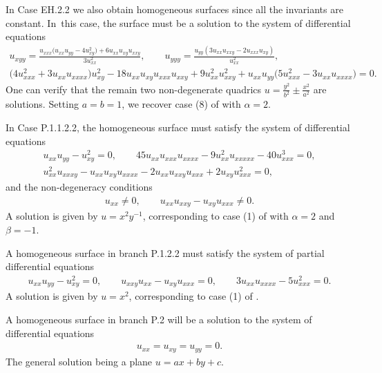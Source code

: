\documentclass[pdftex]{sigma}%
\numberwithin{equation}{section}
\begin{document}
\begin{Example}
In Case EH.2.2 we also obtain homogeneous surfaces since all the invariants are constant. In~this case, the surface must be a solution to the system of differential equations
\begin{gather*}
u_ {xyy}=\frac{u_{xxx} \big(u_{xx} u_{yy}-4 u_ {xy}^2\big)+6 u_{xx} u_{xy}u_{xxy}}{3 u_ {xx}^2},\qquad
u_ {yyy}=\frac{u_{yy} (3 u_{xx} u_{xxy}-2u_{xxx} u_{xy})}{u_ {xx}^2},\\
%
\big(4 u_{xxx}^2\!+3 u_{xx} u_{xxxx}\big) u_{xy}^2\!-18 u_{xx}u_{xy} u_{xxx}u_{xxy} \!+9 u_{xx}^2 u_{xxy}^2\!+u_{xx}u_{yy}\big(5 u_{xxx}^2\!-3 u_{xx}u_{xxxx}\big) = 0.
\end{gather*}
%
One can verify that the remain two non-degenerate quadrics $u=\frac{y^2}{b^2}\pm \frac{x^2}{a^2}$ are solutions. Setting $a=b=1$, we recover case (8) of \cite[Theorem 1]{DKR-1996} with $\alpha=2$.
\end{Example}

\begin{Example}
In Case P.1.1.2.2, the homogeneous surface must satisfy the system of differential equations
\begin{gather*}
u_{xx} u_{yy} - u_{xy}^2 =0,\qquad
45u_{xx} u_{xxx} u_{xxxx} - 9 u_{xx}^2 u_{xxxxx} -40 u_{xxx}^3=0,\\
u_{xx}^2 u_{xxxy}-u_{xx}u_{xy}u_{xxxx}-2u_{xx}u_{xxy} u_{xxx}+2u_{xy}u_{xxx}^2=0,
\end{gather*}
and the non-degeneracy conditions
\begin{gather*}
u_{xx}\neq 0,\qquad u_{xx}u_{xxy}-u_{xy}u_{xxx}\neq 0.
\end{gather*}
A solution is given by $u=x^2 y^{-1}$, corresponding to case (1) of \cite[Theorem 1]{DKR-1996} with $\alpha=2$ and~$\beta=-1$.
\end{Example}

\begin{Example}
A homogeneous surface in branch P.1.2.2 must satisfy the system of partial differential equations
\begin{gather*}
u_{xx}u_{yy}-u_{xy}^2=0,\qquad u_{xxy}u_{xx}-u_{xy}u_{xxx}=0,\qquad 3u_{xx}u_{xxxx}-5u_{xxx}^2=0.
\end{gather*}
A solution is given by $u=x^2$, corresponding to case (1) of \cite[Theorem 1]{DKR-1996}.
\end{Example}

\begin{Example}
A homogeneous surface in branch P.2 will be a solution to the system of dif\-fe\-ren\-tial equations
\begin{gather*}
u_{xx}=u_{xy}=u_{yy}=0.
\end{gather*}
The general solution being a plane $u=ax+by+c$.
\end{Example}
\end{document}
